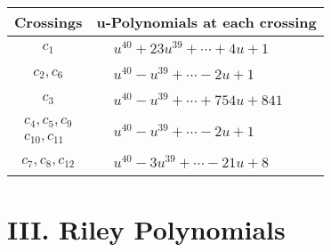 \documentclass[1p]{elsarticle_modified}
\theoremstyle{definition}
\begin{document}
\begin{tabular}{m{50pt}|m{274pt}}
Crossings & \hspace{64pt}u-Polynomials at each crossing \\
\hline $$\begin{aligned}c_{1}\end{aligned}$$&$\begin{aligned}
&u^{40}+23 u^{39}+\cdots+4 u+1
\end{aligned}$\\
\hline $$\begin{aligned}c_{2},c_{6}\end{aligned}$$&$\begin{aligned}
&u^{40}- u^{39}+\cdots-2 u+1
\end{aligned}$\\
\hline $$\begin{aligned}c_{3}\end{aligned}$$&$\begin{aligned}
&u^{40}- u^{39}+\cdots+754 u+841
\end{aligned}$\\
\hline $$\begin{aligned}c_{4},c_{5},c_{9}\\c_{10},c_{11}\end{aligned}$$&$\begin{aligned}
&u^{40}- u^{39}+\cdots-2 u+1
\end{aligned}$\\
\hline $$\begin{aligned}c_{7},c_{8},c_{12}\end{aligned}$$&$\begin{aligned}
&u^{40}-3 u^{39}+\cdots-21 u+8
\end{aligned}$\\
\hline
\end{tabular}\newpage\renewcommand{\arraystretch}{1}
\centering \section*{ III. Riley Polynomials}
\end{document}
